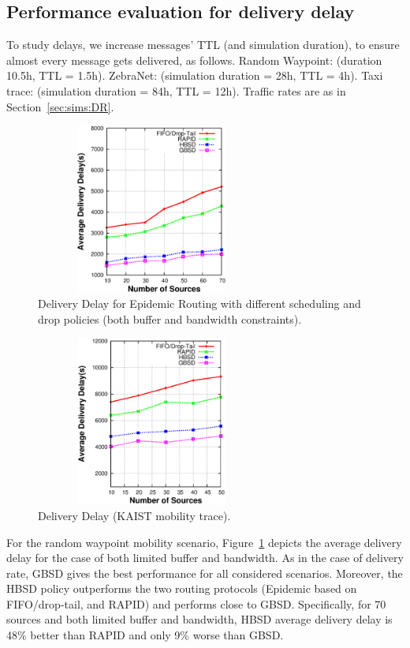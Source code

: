 \subsection{Performance evaluation for delivery delay}
\label{sec:sims:DD}

To study delays, we increase messages' TTL (and simulation duration), to ensure almost every message gets delivered, as follows. Random Waypoint: (duration 10.5h, TTL = 1.5h). ZebraNet: (simulation duration = 28h, TTL = 4h). Taxi trace:  (simulation duration = 84h, TTL = 12h). Traffic rates are as in Section~\ref{sec:sims:DR}.

\begin{figure}[!h]
\centering
\includegraphics[width=3in,height=2.2in]{Chapitre3/fig3.eps}
\caption{Delivery Delay for Epidemic Routing with different scheduling and drop policies (both buffer and bandwidth constraints).}
\label{DD-RWP}
\end{figure}

\begin{figure}[!h]
\centering
\includegraphics[width=3in,height=2.2in]{Chapitre3/fig33.eps}
\caption{Delivery Delay (KAIST mobility trace).}
\label{DD-KAIST}
\end{figure}

For the random waypoint mobility scenario, Figure~\ref{DD-RWP} depicts the
average delivery delay for the case of both limited buffer and
bandwidth. As in the case of delivery rate, GBSD gives the best
performance for all considered scenarios. Moreover, the HBSD policy
outperforms the two routing protocols (Epidemic based on
FIFO/drop-tail, and RAPID) and performs close to GBSD. Specifically,
for 70 sources and both limited buffer and bandwidth, HBSD average
delivery delay is 48\% better than RAPID and only 9\% worse than
GBSD.

